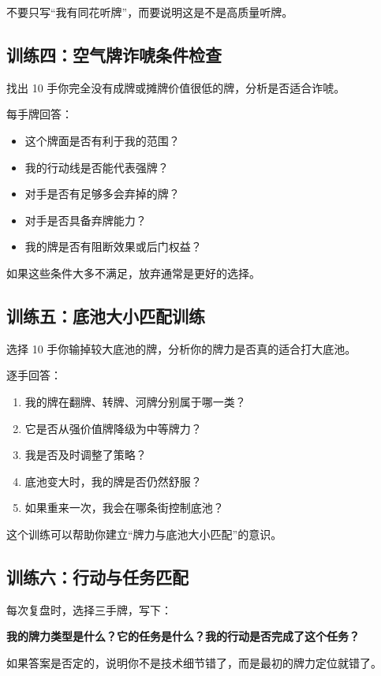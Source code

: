 不要只写“我有同花听牌”，而要说明这是不是高质量听牌。

\subsection*{训练四：空气牌诈唬条件检查}

找出 10 手你完全没有成牌或摊牌价值很低的牌，分析是否适合诈唬。

每手牌回答：

\begin{itemize}
\item 这个牌面是否有利于我的范围？
\item 我的行动线是否能代表强牌？
\item 对手是否有足够多会弃掉的牌？
\item 对手是否具备弃牌能力？
\item 我的牌是否有阻断效果或后门权益？
\end{itemize}

如果这些条件大多不满足，放弃通常是更好的选择。

\subsection*{训练五：底池大小匹配训练}

选择 10 手你输掉较大底池的牌，分析你的牌力是否真的适合打大底池。

逐手回答：

\begin{enumerate}
\item 我的牌在翻牌、转牌、河牌分别属于哪一类？
\item 它是否从强价值牌降级为中等牌力？
\item 我是否及时调整了策略？
\item 底池变大时，我的牌是否仍然舒服？
\item 如果重来一次，我会在哪条街控制底池？
\end{enumerate}

这个训练可以帮助你建立“牌力与底池大小匹配”的意识。

\subsection*{训练六：行动与任务匹配}

每次复盘时，选择三手牌，写下：

\begin{center}
\textbf{我的牌力类型是什么？它的任务是什么？我的行动是否完成了这个任务？}
\end{center}

如果答案是否定的，说明你不是技术细节错了，而是最初的牌力定位就错了。
